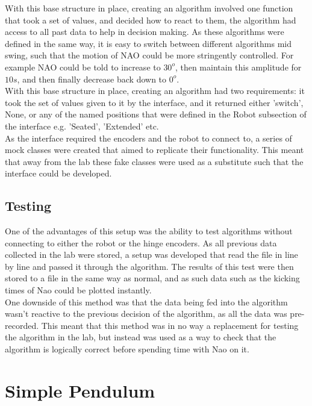 \documentclass[11pt]{article}
\begin{document}
With this base structure in place, creating an algorithm involved one function that took a set of values, and decided how to react to them, the algorithm had access to all past data to help in decision making. As these algorithms were defined in the same way, it is easy to switch between different algorithms mid swing, such that the motion of NAO could be more stringently controlled. For example NAO could be told to increase to $30^o$, then maintain this amplitude for $10s$, and then finally decrease back down to $0^o$.\\

With this base structure in place, creating an algorithm had two requirements: it took the set of values given to it by the interface, and it returned either 'switch', None, or any of the named positions that were defined in the Robot subsection of the interface e.g. 'Seated', 'Extended' etc.\\

As the interface required the encoders and the robot to connect to, a series of mock classes were created that aimed to replicate their functionality. This meant that away from the lab these fake classes were used as a substitute such that the interface could be developed.

\subsection{Testing}
One of the advantages of this setup was the ability to test algorithms without connecting to either the robot or the hinge encoders. As all previous data collected in the lab were stored, a setup was developed that read the file in line by line and passed it through the algorithm. The results of this test were then stored to a file in the same way as normal, and as such data such as the kicking times of Nao could be plotted instantly.\\

One downside of this method was that the data being fed into the algorithm wasn't reactive to the previous decision of the algorithm, as all the data was pre-recorded. This meant that this method was in no way a replacement for testing the algorithm in the lab, but instead was used as a way to check that the algorithm is logically correct before spending time with Nao on it.


\section{Simple Pendulum}
\end{document}
